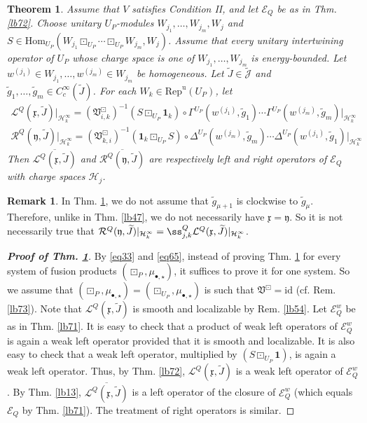 \documentclass[11pt,b5paper,notitlepage]{article}
\theoremstyle{definition}
\newtheorem{rem}[df]{Remark}
\theoremstyle{plain}
\newtheorem{thm}[df]{Theorem}
\newcommand{\fk}{\mathfrak}
\newcommand{\mc}{\mathcal}
\newcommand{\wtd}{\widetilde}
\newcommand{\ovl}{\overline}
\newcommand{\idt}{\mathbf{1}}
\newcommand{\id}{\mathrm{id}}
\newcommand{\Hom}{\mathrm{Hom}}
\newcommand{\scr}{\mathscr}
\newcommand{\Jtd}{\widetilde{\mathcal J}}
\newcommand{\xk}{\mathfrak x}
\newcommand{\yk}{\mathfrak y}
\newcommand{\blt}{\bullet}
\newcommand{\RepUP}{\mathrm{Rep}^{\mathrm u}(U_P)}
\numberwithin{equation}{section}
\begin{document}
\begin{thm}\label{lb83}
Assume that $V$ satisfies Condition II, and let $\scr E_Q$ be as in Thm. \ref{lb72}. Choose unitary $U_P$-modules $W_{j_1},\dots,W_{j_m},W_j$ and $S\in\Hom_{U_P}(W_{j_1}\boxdot_{U_P}\cdots\boxdot_{U_P} W_{j_m},W_j)$. Assume that every unitary intertwining operator of $U_P$ whose charge space is one of $W_{j_1},\dots,W_{j_m}$ is energy-bounded. Let $w^{(j_1)}\in W_{j_1},\dots,w^{(j_m)}\in W_{j_m}$ be homogeneous. Let $\wtd J\in\Jtd$ and $\wtd g_1,\dots,\wtd g_m\in C_c^\infty(\wtd J)$. For each $W_k\in\RepUP$, let
\begin{subequations}
\begin{gather}
\mc L^Q(\xk,\wtd J)\big|_{\mc H_k^\infty}=(\fk V^\boxdot_{i,k})^{-1}(S\boxdot_{U_P}\idt_k)\circ \Gamma^{U_P}(w^{(j_1)},\wtd g_1)\cdots \Gamma^{U_P}(w^{(j_m)},\wtd g_m)\big|_{\mc H_k^\infty}\\
\mc R^Q(\yk,\wtd J)\big|_{\mc H_k^\infty}=(\fk V^\boxdot_{k,i})^{-1}(\idt_k\boxdot_{U_P} S)\circ \Delta^{U_P}(w^{(j_m)},\wtd g_m)\cdots \Delta^{U_P}(w^{(j_1)},\wtd g_1)\big|_{\mc H_k^\infty}
\end{gather}
\end{subequations}
Then $\ovl{\mc L^Q(\xk,\wtd J)}$ and $\ovl{\mc R^Q(\yk,\wtd J)}$ are respectively left and right operators of $\scr E_Q$ with charge spaces $\mc H_j$.
\end{thm}




\begin{rem}
In Thm. \ref{lb83}, we do not assume that $\wtd g_{\mu+1}$ is clockwise to $\wtd g_\mu$. Therefore, unlike in Thm. \ref{lb47}, we do not necessarily have $\xk=\yk$. So it is not necessarily true that $\mc R^Q(\yk,\wtd J)|_{\mc H_k^\infty}=\ss_{j,k}^Q\mc L^Q(\xk,\wtd J)|_{\mc H_k^\infty}$.
\end{rem}

\begin{proof}[\textbf{Proof of Thm. \ref{lb83}}]
By \eqref{eq33} and \eqref{eq65}, instead of proving Thm. \ref{lb83} for every system of fusion products $(\boxdot_P,\mu_{\blt,\star})$, it suffices to prove it for one system. So we assume that $(\boxdot_P,\mu_{\blt,\star})=(\boxdot_{U_P},\mu_{\blt,\star})$ is such that $\fk V^\boxdot=\id$ (cf. Rem. \ref{lb73}). Note that $\mc L^Q(\xk,\wtd J)$ is smooth and localizable by Rem. \ref{lb54}. Let $\scr E^w_Q$ be as in Thm. \ref{lb71}. It is easy to check that a product of weak left operators of $\scr E^w_Q$ is again a weak left operator provided that it is smooth and localizable. It is also easy to check that a weak left operator, multiplied by $(S\boxdot_{U_P}\idt)$, is again a weak left operator. Thus, by Thm. \ref{lb72}, $\mc L^Q(\xk,\wtd J)$ is a weak left operator of $\scr E^w_Q$. By Thm. \ref{lb13}, $\ovl{\mc L^Q(\xk,\wtd J)}$ is a left operator of the closure of $\scr E_Q^w$ (which equals $\scr E_Q$ by Thm. \ref{lb71}). The treatment of right operators is similar.
\end{proof}
\end{document}
